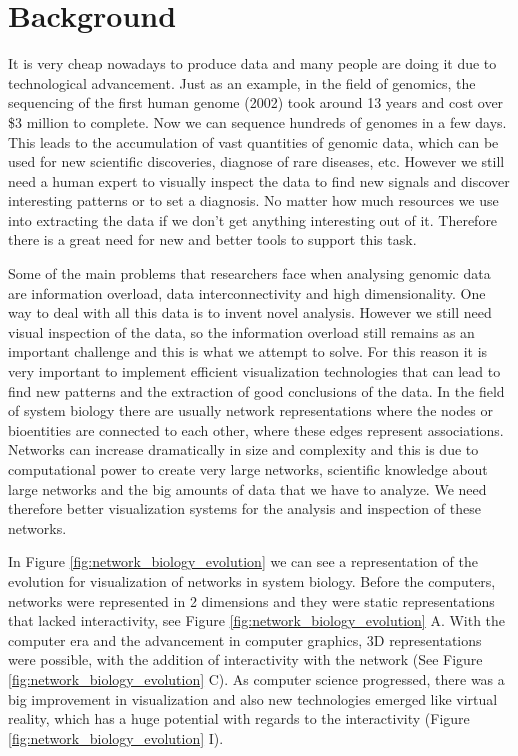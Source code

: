 \section{Background}
It is very cheap nowadays to produce data and many people are doing it due to technological advancement. Just as an example, in the field of genomics, the sequencing of the first human genome (2002) took around 13 years and cost over \$3 million to complete. Now we can sequence hundreds of genomes in a few days\cite{big_biological_impacts_bd}. This leads to the accumulation of vast quantities of genomic data, which can be used for new scientific discoveries, diagnose of rare diseases, etc. However we still need a human expert to visually inspect the data to find new signals and discover interesting patterns or to set a diagnosis. No matter how much resources we use into extracting the data if we don't get anything interesting out of it\cite{zhang_paciorkowski_craig_cui_2019}. Therefore there is a great need for new and better tools to support this task.

Some of the main problems that researchers face when analysing genomic data are information overload, data interconnectivity and high dimensionality. One way to deal with all this data is to invent novel analysis. However we still need visual inspection of the data, so the information overload still remains as an important challenge and this is what we attempt to solve. For this reason it is very important to implement efficient visualization technologies that can lead to find new patterns and the extraction of good conclusions of the data. In the field of system biology there are usually network representations where the nodes or bioentities are connected to each other, where these edges represent associations. Networks can increase dramatically in size and complexity and this is due to computational power to create very large networks, scientific knowledge about large networks and the big amounts of data that we have to analyze. We need therefore better visualization systems for the analysis and inspection of these networks.

In Figure \ref{fig:network_biology_evolution} we can see a representation of the evolution for visualization of networks in system biology. Before the computers, networks were represented in 2 dimensions and they were static representations that lacked interactivity, see Figure \ref{fig:network_biology_evolution} A. With the computer era and the advancement in computer graphics, 3D representations were possible, with the addition of interactivity with the network (See Figure  \ref{fig:network_biology_evolution} C). As computer science progressed, there was a big improvement in visualization and also new technologies emerged like virtual reality, which has a huge potential with regards to the interactivity (Figure \ref{fig:network_biology_evolution} I).

